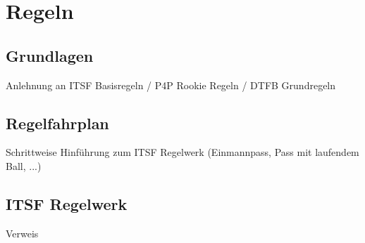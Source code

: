 \chapter{Regeln}
\label{regeln}


\section{Grundlagen}

Anlehnung an ITSF Basisregeln / P4P Rookie Regeln / DTFB Grundregeln

\section{Regelfahrplan}

Schrittweise Hinführung zum ITSF Regelwerk (Einmannpass, Pass mit laufendem Ball, ...)

\section{ITSF Regelwerk}

Verweis 


